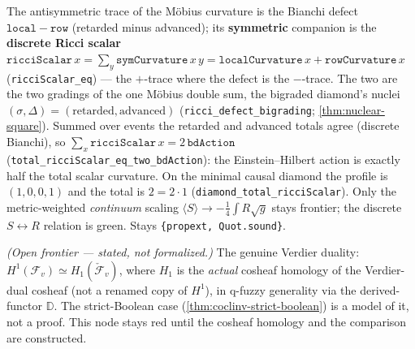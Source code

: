 \begin{theorem}\label{thm:discrete-ricci-scalar}\leanok{}
The antisymmetric trace of the M\"obius curvature is the Bianchi defect $\mathtt{local} - \mathtt{row}$
(retarded minus advanced); its \textbf{symmetric} companion is the \textbf{discrete Ricci scalar}
$\mathtt{ricciScalar}\,x = \sum_y \mathtt{symCurvature}\,x\,y = \mathtt{localCurvature}\,x +
\mathtt{rowCurvature}\,x$ (\texttt{ricciScalar\_eq}) --- the $+$-trace where the defect is the
$-$-trace. The two are the two gradings of the one M\"obius double sum, the bigraded diamond's nuclei
$(\sigma,\Delta) = (\text{retarded},\text{advanced})$ (\texttt{ricci\_defect\_bigrading}; \cref{thm:nuclear-square}).
Summed over events the retarded and advanced totals agree (discrete Bianchi), so $\sum_x
\mathtt{ricciScalar}\,x = 2\,\mathtt{bdAction}$ (\texttt{total\_ricciScalar\_eq\_two\_bdAction}): the
Einstein--Hilbert action is exactly half the total scalar curvature. On the minimal causal diamond the
profile is $(1,0,0,1)$ and the total is $2 = 2\cdot 1$ (\texttt{diamond\_total\_ricciScalar}). Only the
metric-weighted \emph{continuum} scaling $\langle S\rangle \to -\tfrac14\!\int R\sqrt{g}$ stays
frontier; the discrete $S \leftrightarrow R$ relation is green. Stays \texttt{\{propext, Quot.sound\}}.
\end{theorem}

\begin{theorem}\label{thm:aperiodic-verdier-duality}\notready{}
\emph{(Open frontier --- stated, not formalized.)} The genuine Verdier duality:
$H^1(\mathcal{F}_v) \simeq H_1(\check{\mathcal{F}}_v)$, where $H_1$ is the \emph{actual} cosheaf
homology of the Verdier-dual cosheaf (not a renamed copy of $H^1$), in q-fuzzy generality via
the derived-functor $\mathbb{D}$.  The strict-Boolean
case (\cref{thm:coclinv-strict-boolean}) is a model of it, not a proof. This node stays red
until the cosheaf homology and the comparison are constructed.
\end{theorem}
